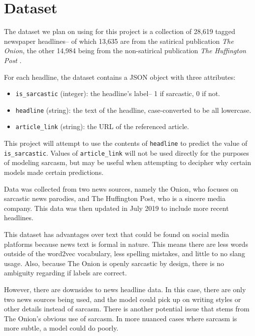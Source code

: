 \documentclass[11pt]{article}
\begin{document}
\section{Dataset}

The dataset we plan on using for this project is a collection of 28,619 tagged
newspaper headlines-- of which 13,635 are from the satirical publication
\textit{The Onion}, the other 14,984 being from the non-satirical publication
\textit{The Huffington Post} \cite{misra2023Sarcasm}.

For each headline, the dataset contains a JSON object with three attributes:
\begin{itemize}
    \item \texttt{is\_sarcastic} (integer): the headline's label-- 1 if
        sarcastic, 0 if not.
    \item \texttt{headline} (string): the text of the headline, case-converted
        to be all lowercase.
    \item \texttt{article\_link} (string): the URL of the referenced article.
\end{itemize}

This project will attempt to use the contents of \texttt{headline} to predict
the value of \texttt{is\_sarcastic}. Values of \texttt{article\_link} will not
be used directly for the purposes of modeling sarcasm, but may be useful when
attempting to decipher why certain models made certain predictions.

Data was collected from two news sources, namely the Onion, who focuses on
sarcastic news parodies, and The Huffington Post, who is a sincere media
company. This data was then updated in July 2019 to include more recent
headlines.

This dataset has advantages over text that could be found on social media
platforms because news text is formal in nature. This means there are less
words outside of the word2vec vocabulary, less spelling mistakes, and little to
no slang usage. Also, because The Onion is openly sarcastic by design, there is
no ambiguity regarding if labels are correct.

However, there are downsides to news headline data. In this case, there are
only two news sources being used, and the model could pick up on writing styles
or other details instead of sarcasm. There is another potential issue that
stems from The Onion's obvious use of sarcasm. In more nuanced cases where
sarcasm is more subtle, a model could do poorly.
\end{document}
